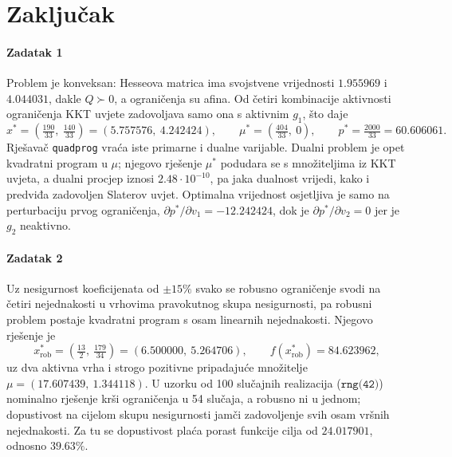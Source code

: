 \section{Zaključak}

\paragraph{Zadatak 1}
Problem je konveksan: Hesseova matrica ima svojstvene vrijednosti $1.955969$ i $4.044031$, dakle $Q \succ 0$, a ograničenja su afina. Od četiri kombinacije aktivnosti ograničenja KKT uvjete zadovoljava samo ona s aktivnim $g_1$, što daje
\begin{equation*}
x^* = \left( \tfrac{190}{33},\ \tfrac{140}{33} \right) = (5.757576,\ 4.242424), \qquad
\mu^* = \left( \tfrac{404}{33},\ 0 \right), \qquad
p^* = \tfrac{2000}{33} = 60.606061 .
\end{equation*}
Rješavač \texttt{quadprog} vraća iste primarne i dualne varijable. Dualni problem je opet kvadratni program u $\mu$; njegovo rješenje $\mu^*$ podudara se s množiteljima iz KKT uvjeta, a dualni procjep iznosi $2.48 \cdot 10^{-10}$, pa jaka dualnost vrijedi, kako i predviđa zadovoljen Slaterov uvjet. Optimalna vrijednost osjetljiva je samo na perturbaciju prvog ograničenja, $\partial p^* / \partial v_1 = -12.242424$, dok je $\partial p^* / \partial v_2 = 0$ jer je $g_2$ neaktivno.

\paragraph{Zadatak 2}
Uz nesigurnost koeficijenata od $\pm 15\%$ svako se robusno ograničenje svodi na četiri nejednakosti u vrhovima pravokutnog skupa nesigurnosti, pa robusni problem postaje kvadratni program s osam linearnih nejednakosti. Njegovo rješenje je
\begin{equation*}
x_{\mathrm{rob}}^* = \left( \tfrac{13}{2},\ \tfrac{179}{34} \right) = (6.500000,\ 5.264706), \qquad
f(x_{\mathrm{rob}}^*) = 84.623962 ,
\end{equation*}
uz dva aktivna vrha i strogo pozitivne pripadajuće množitelje $\mu = (17.607439,\ 1.344118)$. U uzorku od 100 slučajnih realizacija ($\texttt{rng(42)}$) nominalno rješenje krši ograničenja u 54 slučaja, a robusno ni u jednom; dopustivost na cijelom skupu nesigurnosti jamči zadovoljenje svih osam vršnih nejednakosti. Za tu se dopustivost plaća porast funkcije cilja od $24.017901$, odnosno $39.63\%$.

